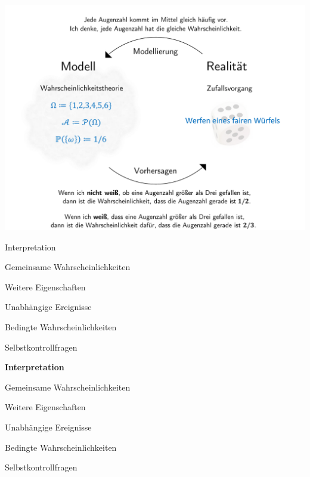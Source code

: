 \documentclass[
  8pt,
  ignorenonframetext,
]{beamer}
\begin{document}
\begin{frame}{}
\protect\hypertarget{section-3}{}
\begin{center}\includegraphics[width=0.9\linewidth]{3_Abbildungen/wtfi_3_wahrscheinlichkeitstheorie_modell_beispiel} \end{center}
\end{frame}

\begin{frame}{}
\protect\hypertarget{section-4}{}
\vfill
\large

Interpretation

Gemeinsame Wahrscheinlichkeiten

Weitere Eigenschaften

Unabhängige Ereignisse

Bedingte Wahrscheinlichkeiten

Selbstkontrollfragen \vfill
\end{frame}

\begin{frame}{}
\protect\hypertarget{section-5}{}
\vfill
\large

\textbf{Interpretation}

Gemeinsame Wahrscheinlichkeiten

Weitere Eigenschaften

Unabhängige Ereignisse

Bedingte Wahrscheinlichkeiten

Selbstkontrollfragen \vfill
\end{frame}
\end{document}
